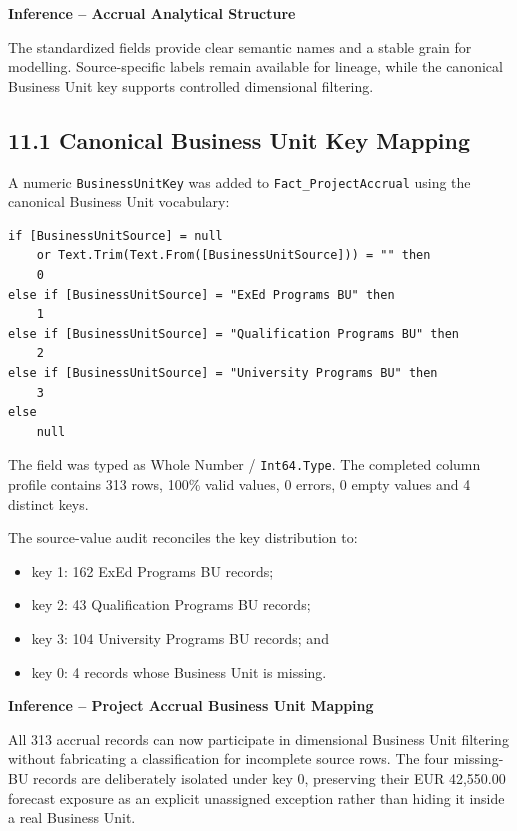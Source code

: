 \documentclass[11pt,a4paper]{article}
\begin{document}
\begin{inferencebox}

\textbf{Inference -- Accrual Analytical Structure}

The standardized fields provide clear semantic names and a stable grain for
modelling. Source-specific labels remain available for lineage, while the
canonical Business Unit key supports controlled dimensional filtering.

\end{inferencebox}

\subsection{11.1 Canonical Business Unit Key Mapping}

A numeric \texttt{BusinessUnitKey} was added to
\texttt{Fact\_ProjectAccrual} using the canonical Business Unit vocabulary:

\begin{lstlisting}[style=powerquery]
if [BusinessUnitSource] = null
    or Text.Trim(Text.From([BusinessUnitSource])) = "" then
    0
else if [BusinessUnitSource] = "ExEd Programs BU" then
    1
else if [BusinessUnitSource] = "Qualification Programs BU" then
    2
else if [BusinessUnitSource] = "University Programs BU" then
    3
else
    null
\end{lstlisting}

The field was typed as Whole Number / \texttt{Int64.Type}. The completed
column profile contains 313 rows, 100\% valid values, 0 errors, 0 empty values
and 4 distinct keys.

The source-value audit reconciles the key distribution to:

\begin{itemize}[leftmargin=7mm,itemsep=2pt]
    \item key 1: 162 ExEd Programs BU records;
    \item key 2: 43 Qualification Programs BU records;
    \item key 3: 104 University Programs BU records; and
    \item key 0: 4 records whose Business Unit is missing.
\end{itemize}

\begin{inferencebox}

\textbf{Inference -- Project Accrual Business Unit Mapping}

All 313 accrual records can now participate in dimensional Business Unit
filtering without fabricating a classification for incomplete source rows.
The four missing-BU records are deliberately isolated under key 0, preserving
their EUR 42,550.00 forecast exposure as an explicit unassigned exception rather
than hiding it inside a real Business Unit.

\end{inferencebox}
\end{document}
